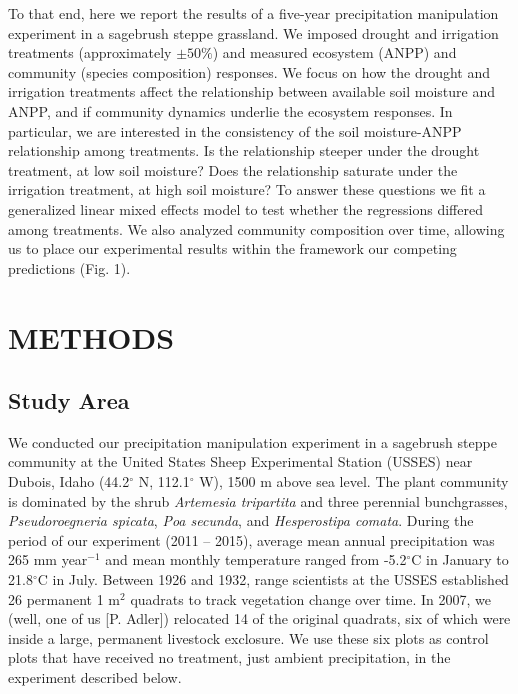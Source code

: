 \documentclass[fleqn,10pt,lineno]{wlpeerj} %
\begin{document}
To that end, here we report the results of a five-year precipitation
manipulation experiment in a sagebrush steppe grassland. We imposed
drought and irrigation treatments (approximately \(\pm50\%\)) and
measured ecosystem (ANPP) and community (species composition) responses.
We focus on how the drought and irrigation treatments affect the
relationship between available soil moisture and ANPP, and if community
dynamics underlie the ecosystem responses. In particular, we are
interested in the consistency of the soil moisture-ANPP relationship
among treatments. Is the relationship steeper under the drought
treatment, at low soil moisture? Does the relationship saturate under
the irrigation treatment, at high soil moisture? To answer these
questions we fit a generalized linear mixed effects model to test
whether the regressions differed among treatments. We also analyzed
community composition over time, allowing us to place our experimental
results within the framework our competing predictions (Fig. 1).

\section{METHODS}\label{methods}

\subsection{Study Area}\label{study-area}

We conducted our precipitation manipulation experiment in a sagebrush
steppe community at the United States Sheep Experimental Station (USSES)
near Dubois, Idaho (44.2\(^{\circ}\) N, 112.1\(^{\circ}\) W), 1500 m
above sea level. The plant community is dominated by the shrub
\emph{Artemesia tripartita} and three perennial bunchgrasses,
\emph{Pseudoroegneria spicata}, \emph{Poa secunda}, and
\emph{Hesperostipa comata}. During the period of our experiment (2011 --
2015), average mean annual precipitation was 265 mm
year\(\phantom{}^{-1}\) and mean monthly temperature ranged from
-5.2\(^{\circ}\)C in January to 21.8\(^{\circ}\)C in July. Between 1926
and 1932, range scientists at the USSES established 26 permanent 1
m\(^2\) quadrats to track vegetation change over time. In 2007, we
(well, one of us {[}P. Adler{]}) relocated 14 of the original quadrats,
six of which were inside a large, permanent livestock exclosure. We use
these six plots as control plots that have received no treatment, just
ambient precipitation, in the experiment described below.
\end{document}
